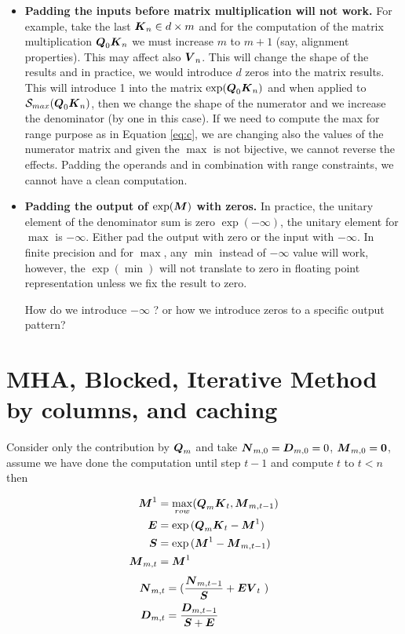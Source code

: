 \documentclass[journal]{IEEEtran}
\begin{document}
\begin{itemize}
  \item {\bf Padding the inputs before matrix multiplication will not
    work.} For example, take the last ${\boldsymbol K}_n \in d\times m$ and for
    the computation of the matrix multiplication ${\boldsymbol Q}_0{\boldsymbol K}_n$ we
    must increase $m$ to $m+1$ (say, alignment properties). This may
    affect also ${\boldsymbol V}_n$.  This will change the shape of the results
    and in practice, we would introduce $d$ zeros into the matrix
    results. This will introduce 1 into the matrix
    $\exp({\boldsymbol Q}_0{\boldsymbol K}_n)$ and when applied to
    $\Smax{\Vc{Q}_0\Vc{K}_n}$, then we change the shape of the
    numerator and we increase the denominator (by one in this
    case). If we need to compute the max for range purpose as in
    Equation \ref{eq:c}, we are changing also the values of the
    numerator matrix and given the $\max$ is not bijective, we cannot
    reverse the effects. Padding the operands and in combination with
    range constraints, we cannot have a clean computation.

  \item {\bf Padding the output of $\exp({\boldsymbol M})$ with zeros.}  In
    practice, the unitary element of the denominator sum is zero
    $\exp(-\infty)$, the unitary element for $\max$ is $-\infty$.
    Either pad the output with zero or the input with $-\infty$. In
    finite precision and for $\max$, any $\min$ instead of $-\infty$
    value will work, however, the $\exp(\min)$ will not translate to
    zero in floating point representation unless we fix the result to
    zero.

    How do we introduce $-\infty$ ? or how we introduce zeros to a
    specific output pattern?

 
    
    

\end{itemize}






\section{MHA, Blocked, Iterative Method by columns, and caching}
\label{sec:iterative}
Consider only the contribution by ${\boldsymbol Q}_m$ and take ${\boldsymbol N}_{m,0}=
{\boldsymbol D}_{m,0}=0$, ${\boldsymbol M}_{m,0} = {\boldsymbol 0}$, assume we have done the
computation until step $t-1$ and compute $t$ to $t<n$ then

\begin{align*}
  {\boldsymbol M}^1  &= \max_{row}({\boldsymbol Q}_m{\boldsymbol K}_{t},{\boldsymbol M}_{m,t-1}) \\
  {\boldsymbol E}    & =\exp{({\boldsymbol Q}_m{\boldsymbol K}_{t}-{\boldsymbol M}^1)} \\
  {\boldsymbol S}    & =\exp{({\boldsymbol M}^1 - {\boldsymbol M}_{m,t-1})} \\
  {\boldsymbol M}_{m,t}   & ={\boldsymbol M}^1 \\
\end{align*}
\begin{align}
  \label{eq:sum0}
  \Vc{N}_{m,t}  &=( \frac{\Vc{N}_{m,t-1}}{\Vc{S}}  + \Vc{E}\Vc{V}_{t}\  ) \\
  \label{eq:sum1}
  \Vc{D}_{m,t} &= \frac{\Vc{D}_{m,t-1}}{\Vc{S} +\Vc{E}} 
\end{align}
\end{document}
